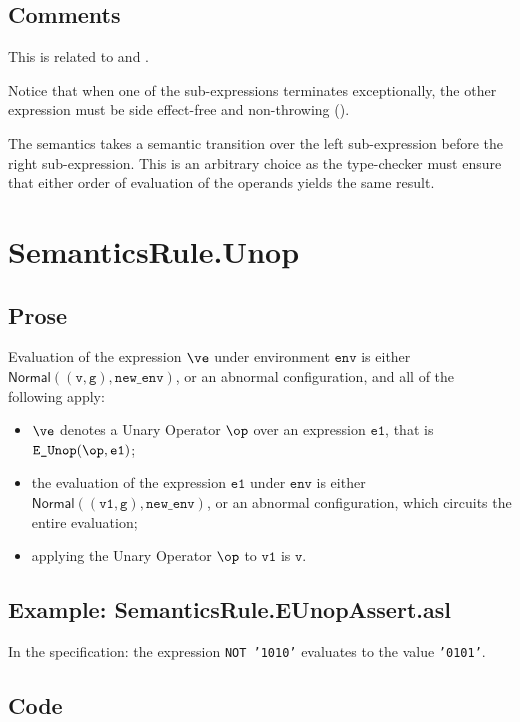 \documentclass{book}
\newcommand\Normal[0]{\textsf{Normal}}
\newcommand\newenv[0]{\texttt{new\_env}}
\newcommand\env[0]{\texttt{env}}
\newcommand\vg[0]{\texttt{g}}
\newcommand\vv[0]{\texttt{v}}
\newcommand\vvone[0]{\texttt{v1}}
\newcommand\veone[0]{\texttt{e1}}
\begin{document}
\subsection{Comments}
  This is related to  and .

Notice that when one of the sub-expressions terminates exceptionally,
the other expression must be side effect-free and non-throwing ().

The semantics takes a semantic transition over the left sub-expression before the right sub-expression.
This is an arbitrary choice as the type-checker must ensure that either order of evaluation of the operands
yields the same result.

\section{SemanticsRule.Unop \label{sec:SemanticsRule.Unop}}
  \subsection{Prose}
  Evaluation of the expression $\ve$ under environment $\env$ is either \\
  $\Normal((\vv, \vg), \newenv)$,
  or an abnormal configuration, and all of the following apply:
  \begin{itemize}
  \item $\ve$ denotes a Unary Operator $\op$ over an expression $\veone$, that is\\ $\texttt{E\_Unop}(\op, \veone)$;
  \item the evaluation of the expression $\veone$ under $\env$ is either \\ $\Normal((\vvone, \vg), \newenv)$,
  or an abnormal configuration, which circuits the entire evaluation;
  \item applying the Unary Operator $\op$ to $\vvone$ is $\vv$.
  \end{itemize}

  \subsection{Example: SemanticsRule.EUnopAssert.asl}
    In the specification:
    the expression \texttt{NOT '1010'} evaluates to the value \texttt{'0101'}.

  \subsection{Code}
\end{document}
